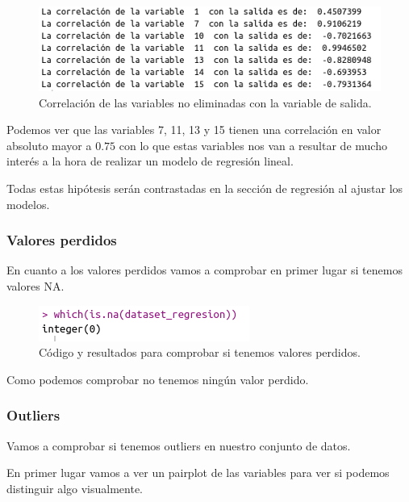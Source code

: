 \documentclass[12pt,a4paper]{article}
\begin{document}
\begin{figure}[H]
	\centering
	\includegraphics[scale=0.6]{./Imagenes/correlacion_variable_salida1.png}
	\caption{Correlación de las variables no eliminadas con la variable de salida.}
\end{figure}

Podemos ver que las variables 7, 11, 13 y 15 tienen una correlación en valor absoluto mayor a $0.75$ con lo que estas variables nos van a resultar de mucho interés a la hora de realizar un modelo de regresión lineal.

Todas estas hipótesis serán contrastadas en la sección de regresión al ajustar los modelos.

\subsubsection{Valores perdidos}

En cuanto a los valores perdidos vamos a comprobar en primer lugar si tenemos valores NA.

\begin{figure}[H]
	\centering
	\includegraphics[scale=0.6]{./Imagenes/valores_perdidos.png}
	\caption{Código y resultados para comprobar si tenemos valores perdidos.}
\end{figure}

Como podemos comprobar no tenemos ningún valor perdido.

\subsubsection{Outliers}

Vamos a comprobar si tenemos outliers en nuestro conjunto de datos.

En primer lugar vamos a ver un pairplot de las variables para ver si podemos distinguir algo visualmente.
\end{document}

